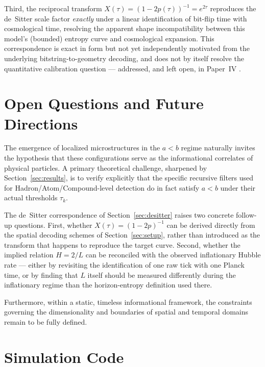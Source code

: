 \documentclass[11pt]{article}
\begin{document}
Third, the reciprocal transform $X(\tau)=(1-2p(\tau))^{-1}=e^{2\tau}$ reproduces the de~Sitter scale factor
\emph{exactly} under a linear identification of bit-flip time with cosmological time, resolving the apparent
shape incompatibility between this model's (bounded) entropy curve and cosmological expansion. This
correspondence is exact in form but not yet independently motivated from the underlying bitstring-to-geometry
decoding, and does not by itself resolve the quantitative calibration question --- addressed, and left open,
in Paper~IV \cite{meskanen2026iv}.

\section{Open Questions and Future Directions}

The emergence of localized microstructures in the $a<b$ regime naturally invites the hypothesis that these
configurations serve as the informational correlates of physical particles. A primary theoretical challenge,
sharpened by Section~\ref{sec:results}, is to verify explicitly that the specific recursive filters used for
Hadron/Atom/Compound-level detection do in fact satisfy $a<b$ under their actual thresholds $\tau_k$.

The de~Sitter correspondence of Section~\ref{sec:desitter} raises two concrete follow-up questions. First,
whether $X(\tau)=(1-2p)^{-1}$ can be derived directly from the spatial decoding schemes of Section~\ref{sec:setup},
rather than introduced as the transform that
happens to reproduce the target curve. Second, whether the implied relation $H=2/L$ can be reconciled with
the observed inflationary Hubble rate --- either by revisiting the identification of one raw tick with one
Planck time, or by finding that $L$ itself should be measured differently during the inflationary regime than the horizon-entropy definition
used there. 

Furthermore, within a static, timeless informational framework, the constraints governing the
dimensionality and boundaries of spatial and temporal domains remain to be fully defined.


\section*{Simulation Code}
\end{document}
